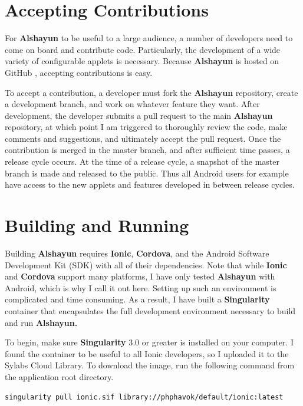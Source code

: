 \documentclass[12pt]{report}
\begin{document}
    \section{Accepting Contributions}

For \textbf{Alshayun} to be useful to a large audience, a number of developers
need to come on board and contribute code. Particularly, the development of a
wide variety of configurable applets is necessary. Because \textbf{Alshayun} is
hosted on GitHub \cite{github}, accepting contributions is easy.

To accept a contribution, a developer must fork the \textbf{Alshayun}
repository, create a development branch, and work on whatever feature they want.
After development, the developer submits a pull request to the main
\textbf{Alshayun} repository, at which point I am triggered to thoroughly review
the code, make comments and suggestions, and ultimately accept the pull request.
Once the contribution is merged in the master branch, and after sufficient time
passes, a release cycle occurs. At the time of a release cycle, a snapshot of
the master branch is made and released to the public.  Thus all Android users
for example have access to the new applets and features developed in between
release cycles.

    \section{Building and Running}

Building \textbf{Alshayun} requires \textbf{Ionic}, \textbf{Cordova}, and the
Android Software Development Kit (SDK) with all of their dependencies. Note that
while \textbf{Ionic} and \textbf{Cordova} support many platforms, I have only
tested \textbf{Alshayun} with Android, which is why I call it out here. Setting
up such an environment is complicated and time consuming. As a result, I have
built a \textbf{Singularity} container that encapsulates the full development
environment necessary to build and run \textbf{Alshayun.}

To begin, make sure \textbf{Singularity} 3.0 \cite{singularity3inst} or greater
is installed on your computer. I found the container to be useful to all Ionic
developers, so I uploaded it to the Sylabs Cloud Library. To download the image,
run the following command from the application root directory.

\begin{verbatim}
singularity pull ionic.sif library://phphavok/default/ionic:latest
\end{verbatim}
\end{document}
